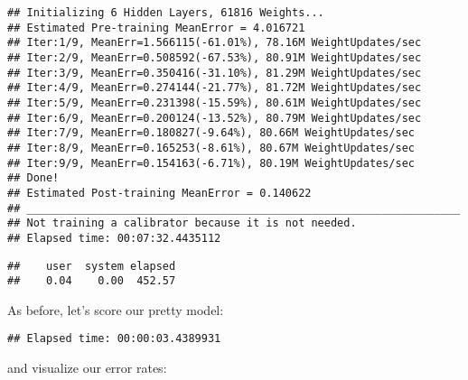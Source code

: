 \documentclass[]{book}
\newenvironment{Shaded}{\begin{snugshade}}{\end{snugshade}}
\newcommand{\KeywordTok}[1]{\textcolor[rgb]{0.13,0.29,0.53}{\textbf{#1}}}
\newcommand{\DataTypeTok}[1]{\textcolor[rgb]{0.13,0.29,0.53}{#1}}
\newcommand{\StringTok}[1]{\textcolor[rgb]{0.31,0.60,0.02}{#1}}
\newcommand{\OtherTok}[1]{\textcolor[rgb]{0.56,0.35,0.01}{#1}}
\newcommand{\OperatorTok}[1]{\textcolor[rgb]{0.81,0.36,0.00}{\textbf{#1}}}
\newcommand{\NormalTok}[1]{#1}
\theoremstyle{definition}
\theoremstyle{definition}
\theoremstyle{definition}
\theoremstyle{remark}
\begin{document}
\begin{verbatim}
## Initializing 6 Hidden Layers, 61816 Weights...
## Estimated Pre-training MeanError = 4.016721
## Iter:1/9, MeanErr=1.566115(-61.01%), 78.16M WeightUpdates/sec
## Iter:2/9, MeanErr=0.508592(-67.53%), 80.91M WeightUpdates/sec
## Iter:3/9, MeanErr=0.350416(-31.10%), 81.29M WeightUpdates/sec
## Iter:4/9, MeanErr=0.274144(-21.77%), 81.72M WeightUpdates/sec
## Iter:5/9, MeanErr=0.231398(-15.59%), 80.61M WeightUpdates/sec
## Iter:6/9, MeanErr=0.200124(-13.52%), 80.79M WeightUpdates/sec
## Iter:7/9, MeanErr=0.180827(-9.64%), 80.66M WeightUpdates/sec
## Iter:8/9, MeanErr=0.165253(-8.61%), 80.67M WeightUpdates/sec
## Iter:9/9, MeanErr=0.154163(-6.71%), 80.19M WeightUpdates/sec
## Done!
## Estimated Post-training MeanError = 0.140622
## ___________________________________________________________________
## Not training a calibrator because it is not needed.
## Elapsed time: 00:07:32.4435112
\end{verbatim}

\begin{verbatim}
##    user  system elapsed 
##    0.04    0.00  452.57
\end{verbatim}

As before, let's score our pretty model:

\begin{Shaded}
\end{Shaded}

\begin{verbatim}
## Elapsed time: 00:00:03.4389931
\end{verbatim}

and visualize our error rates:
\end{document}
